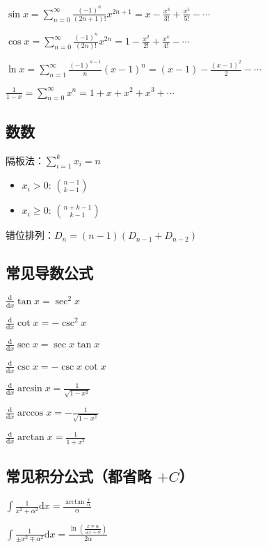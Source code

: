 \documentclass[9pt,landscape]{article}
\begin{document}
\begin{multicols}{3}
$\sin x = \sum_{n=0}^{\infty} \frac{(-1)^n}{(2n+1)!}x^{2n+1} = x - \frac{x^3}{3!} + \frac{x^5}{5!} - \cdots$

$\cos x = \sum_{n=0}^{\infty} \frac{(-1)^n}{(2n)!}x^{2n} = 1 - \frac{x^2}{2!} + \frac{x^4}{4!} - \cdots$

$\ln x = \sum_{n=1}^{\infty} \frac{(-1)^{n-1}}{n}(x-1)^n = (x-1) - \frac{(x-1)^2}{2} - \cdots$

$\frac{1}{1-x} = \sum_{n=0}^{\infty} x^n = 1 + x + x^2 + x^3 + \cdots$

\subsection{数数}

隔板法：$\sum_{i=1}^{k} x_i=n$
\begin{itemize}
	\item $x_i>0$: $\binom{n-1}{k-1}$
	\item $x_i\ge 0$: $\binom{n+k-1}{k-1}$
\end{itemize}

错位排列：$D_n=(n-1)\left(D_{n-1}+D_{n-2}\right)$

\subsection{常见导数公式}

$\frac{\mathrm{d}}{\mathrm{d}x}\tan x=\sec ^{2}x$

$\frac{\mathrm{d}}{\mathrm{d}x}\cot x=-\csc ^{2}x$

$\frac{\mathrm{d}}{\mathrm{d}x}\sec x=\sec x\tan x$

$\frac{\mathrm{d}}{\mathrm{d}x}\csc x=-\csc x\cot x$

$\frac{\mathrm{d}}{\mathrm{d}x}\arcsin x={\frac {1}{\sqrt {1-x^{2}}}}$

$\frac{\mathrm{d}}{\mathrm{d}x}\arccos x=-{\frac {1}{\sqrt {1-x^{2}}}}$

$\frac{\mathrm{d}}{\mathrm{d}x}\arctan x={\frac {1}{1+x^{2}}}$

\subsection{常见积分公式（都省略 $+C$）}

$ \int {\frac {1}{x^{2}+\alpha ^{2}}}{\mbox{d}}x={\frac {\arctan {\frac {x}{\alpha }}}{\alpha }} $

$ \int {\frac {1}{\pm x^{2}\mp \alpha ^{2}}}{\mbox{d}}x={\frac {\ln \left({\frac {x\mp \alpha }{\pm x+\alpha }}\right)}{2\alpha }} $


\end{multicols}
\end{document}
